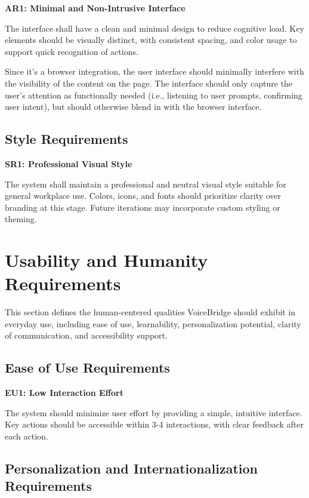 \documentclass[11pt]{article}
\begin{document}
\textbf{AR1: Minimal and Non-Intrusive Interface}\label{req:AR1}

The interface shall have a clean and minimal design to reduce cognitive load. Key elements should be visually distinct, with consistent spacing, and color usage to support quick recognition of actions.

Since it’s a browser integration, the user interface should minimally interfere with the visibility of the content on the page. The interface should only capture the user’s attention as functionally needed (i.e., listening to user prompts, confirming user intent), but should otherwise blend in with the browser interface.

\subsection{Style Requirements}\label{subsec:style}

\textbf{SR1: Professional Visual Style}\label{req:SR1}

The system shall maintain a professional and neutral visual style suitable for general workplace use. Colors, icons, and fonts should prioritize clarity over branding at this stage. Future iterations may incorporate custom styling or theming.


\section{Usability and Humanity Requirements}\label{sec:usability-humanity}
This section defines the human-centered qualities VoiceBridge should exhibit in everyday use, including ease of use, learnability, personalization potential, clarity of communication, and accessibility support.

\subsection{Ease of Use Requirements}\label{subsec:ease-of-use}
\textbf{EU1: Low Interaction Effort}\label{req:EU1}

The system should minimize user effort by providing a simple, intuitive interface. Key actions should be accessible within 3-4 interactions, with clear feedback after each action.
\subsection{Personalization and Internationalization Requirements}\label{subsec:personalization}
\end{document}
